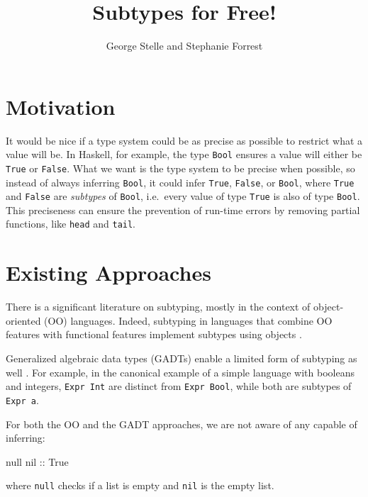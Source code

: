 \documentclass[]{article}
\title{Subtypes for Free!}
\author{George Stelle and Stephanie Forrest}
\date{}
\newenvironment{Shaded}{}{}
\newcommand{\DataTypeTok}[1]{\textcolor[rgb]{0.56,0.13,0.00}{{#1}}}
\newcommand{\OtherTok}[1]{\textcolor[rgb]{0.00,0.44,0.13}{{#1}}}
\newcommand{\NormalTok}[1]{{#1}}
\begin{document}
\maketitle

\section{Motivation}\label{motivation}

It would be nice if a type system could be as precise as possible to
restrict what a value will be. In Haskell, for example, the type
\texttt{Bool} ensures a value will either be \texttt{True} or
\texttt{False}. What we want is the type system to be precise when
possible, so instead of always inferring \texttt{Bool}, it could infer
\texttt{True}, \texttt{False}, or \texttt{Bool}, where \texttt{True} and
\texttt{False} are \emph{subtypes} of \texttt{Bool}, i.e.~every value of
type \texttt{True} is also of type \texttt{Bool}. This preciseness can
ensure the prevention of run-time errors by removing partial functions,
like \texttt{head} and \texttt{tail}.

\section{Existing Approaches}\label{existing-approaches}

There is a significant literature on subtyping, mostly in the context of
object-oriented (OO) languages. Indeed, subtyping in languages that
combine OO features with functional features implement subtypes using
objects \cite{odersky2004overview, leroy2014ocaml}.

Generalized algebraic data types (GADTs) enable a limited form of
subtyping as well \cite{fluet2006phantom}. For example, in the canonical
example of a simple language with booleans and integers,
\texttt{Expr\ Int} are distinct from \texttt{Expr\ Bool}, while both are
subtypes of \texttt{Expr\ a}.

For both the OO and the GADT approaches, we are not aware of any capable
of inferring:

\begin{Shaded}
\begin{Highlighting}[]
   \NormalTok{null}\OtherTok{ nil ::} \DataTypeTok{True}
\end{Highlighting}
\end{Shaded}

where \texttt{null} checks if a list is empty and \texttt{nil} is the
empty list.
\end{document}
